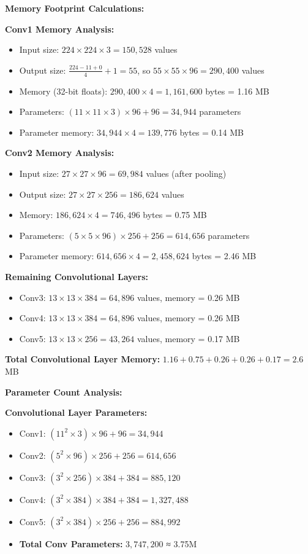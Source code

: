 \documentclass[12pt]{article}
\begin{document}
\begin{enumerate}[(a)]
{    \textbf{Memory Footprint Calculations:}
    
    \textbf{Conv1 Memory Analysis:}
    \begin{itemize}
        \item Input size: $224 \times 224 \times 3 = 150,528$ values
        \item Output size: $\frac{224-11+0}{4} + 1 = 55$, so $55 \times 55 \times 96 = 290,400$ values
        \item Memory (32-bit floats): $290,400 \times 4 = 1,161,600$ bytes = 1.16 MB
        \item Parameters: $(11 \times 11 \times 3) \times 96 + 96 = 34,944$ parameters
        \item Parameter memory: $34,944 \times 4 = 139,776$ bytes = 0.14 MB
    \end{itemize}
    
    \textbf{Conv2 Memory Analysis:}
    \begin{itemize}
        \item Input size: $27 \times 27 \times 96 = 69,984$ values (after pooling)
        \item Output size: $27 \times 27 \times 256 = 186,624$ values
        \item Memory: $186,624 \times 4 = 746,496$ bytes = 0.75 MB
        \item Parameters: $(5 \times 5 \times 96) \times 256 + 256 = 614,656$ parameters
        \item Parameter memory: $614,656 \times 4 = 2,458,624$ bytes = 2.46 MB
    \end{itemize}
    
    \textbf{Remaining Convolutional Layers:}
    \begin{itemize}
        \item Conv3: $13 \times 13 \times 384 = 64,896$ values, memory = 0.26 MB
        \item Conv4: $13 \times 13 \times 384 = 64,896$ values, memory = 0.26 MB  
        \item Conv5: $13 \times 13 \times 256 = 43,264$ values, memory = 0.17 MB
    \end{itemize}
    
    \textbf{Total Convolutional Layer Memory:} $1.16 + 0.75 + 0.26 + 0.26 + 0.17 = 2.6$ MB
    
    \textbf{Parameter Count Analysis:}
    
    \textbf{Convolutional Layer Parameters:}
    \begin{itemize}
        \item Conv1: $(11^2 \times 3) \times 96 + 96 = 34,944$
        \item Conv2: $(5^2 \times 96) \times 256 + 256 = 614,656$  
        \item Conv3: $(3^2 \times 256) \times 384 + 384 = 885,120$
        \item Conv4: $(3^2 \times 384) \times 384 + 384 = 1,327,488$
        \item Conv5: $(3^2 \times 384) \times 256 + 256 = 884,992$
        \item \textbf{Total Conv Parameters:} $3,747,200$ ≈ 3.75M
    \end{itemize}
    
}
\end{enumerate}
\end{document}
